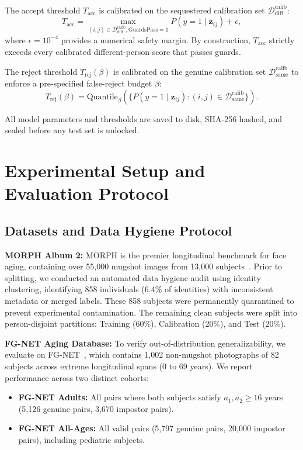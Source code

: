 \documentclass[10pt,journal,compsoc]{IEEEtran}
\newcommand{\vect}[1]{\mathbf{#1}}
\begin{document}
The accept threshold $T_{\text{acc}}$ is calibrated on the sequestered calibration set $\mathcal{D}_{\text{diff}}^{\text{calib}}$:
\begin{equation}
\label{eq:t_acc}
T_{\text{acc}} = \max_{(i, j) \in \mathcal{D}_{\text{diff}}^{\text{calib}}, \text{GuardsPass}=1} P(y=1 \mid \vect{z}_{ij}) + \epsilon,
\end{equation}
where $\epsilon = 10^{-4}$ provides a numerical safety margin. By construction, $T_{\text{acc}}$ strictly exceeds every calibrated different-person score that passes guards.

The reject threshold $T_{\text{rej}}(\beta)$ is calibrated on the genuine calibration set $\mathcal{D}_{\text{same}}^{\text{calib}}$ to enforce a pre-specified false-reject budget $\beta$:
\begin{equation}
\label{eq:t_rej}
T_{\text{rej}}(\beta) = \text{Quantile}_{\beta}(\{P(y=1 \mid \vect{z}_{ij}) : (i, j) \in \mathcal{D}_{\text{same}}^{\text{calib}}\}).
\end{equation}

All model parameters and thresholds are saved to disk, SHA-256 hashed, and sealed before any test set is unlocked.

\section{Experimental Setup and Evaluation Protocol}
\label{sec:experiments}

\subsection{Datasets and Data Hygiene Protocol}
\textbf{MORPH Album 2:} MORPH is the premier longitudinal benchmark for face aging, containing over 55,000 mugshot images from 13,000 subjects~\cite{ricanek2006morph}. Prior to splitting, we conducted an automated data hygiene audit using identity clustering, identifying 858 individuals (6.4\% of identities) with inconsistent metadata or merged labels. These 858 subjects were permanently quarantined to prevent experimental contamination. The remaining clean subjects were split into person-disjoint partitions: Training (60\%), Calibration (20\%), and Test (20\%).

\textbf{FG-NET Aging Database:} To verify out-of-distribution generalizability, we evaluate on FG-NET~\cite{lanitis2002fgnet}, which contains 1,002 non-mugshot photographs of 82 subjects across extreme longitudinal spans (0 to 69 years). We report performance across two distinct cohorts:
\begin{itemize}
    \item \textbf{FG-NET Adults:} All pairs where both subjects satisfy $a_1, a_2 \ge 16$ years (5,126 genuine pairs, 3,670 impostor pairs).
    \item \textbf{FG-NET All-Ages:} All valid pairs (5,797 genuine pairs, 20,000 impostor pairs), including pediatric subjects.
\end{itemize}
\end{document}
